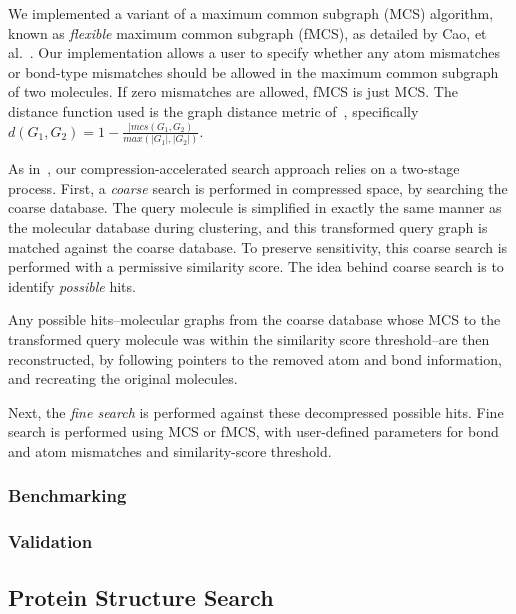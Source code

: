 \documentclass[review,preprint,12pt]{elsarticle}
\renewcommand{\cite}{\citep} %
\theoremstyle{definition}
\theoremstyle{remark}
\numberwithin{equation}{section}
\begin{document}
We implemented a variant of a maximum common subgraph (MCS) algorithm, known as 
\emph{flexible} maximum
common subgraph (fMCS), as detailed by Cao, et al.~\cite{cao2008maximum}.
Our implementation allows a user to specify whether any atom mismatches or 
bond-type mismatches should be 
allowed in the maximum common subgraph of two molecules.
If zero mismatches are allowed, fMCS is just MCS.
The distance function used is the graph distance metric 
of~\cite{bunke1998graph},
specifically $d(G_1,G_2) = 1 - \frac{|mcs(G_1,G_2)}{max(|G_1|,|G_2|)}$.

As in~\cite{loh2012compressive}, our compression-accelerated search approach 
relies on a two-stage process.
First, a \emph{coarse} search is performed in compressed space, by searching 
the coarse database.
The query molecule is simplified in exactly the same manner as 
the molecular database during clustering, and this transformed query graph is 
matched against the coarse database.
To preserve sensitivity, this coarse search is performed with a permissive 
similarity score.
The idea behind coarse search is to identify \emph{possible} hits.


Any possible hits--molecular graphs from the coarse database whose MCS to 
the transformed query molecule was within the similarity score threshold--are 
then reconstructed, by following
pointers to the removed atom and bond information, and recreating the 
original molecules.

Next, the \emph{fine search} is performed against these decompressed possible 
hits.
Fine search is performed using MCS or fMCS, with user-defined parameters for 
bond and atom mismatches and similarity-score threshold.

\subsubsection{Benchmarking}



\subsubsection{Validation}

\subsection{Protein Structure Search}
\end{document}

